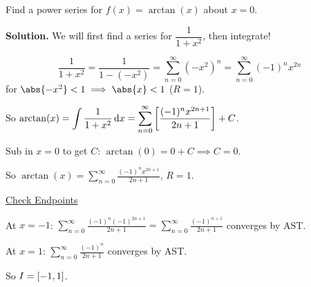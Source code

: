 \begin{Example}{}{}
    Find a power series for $ f(x)=\arctan(x) $ about $ x=0 $.

    \textbf{Solution.} We will first find a series for $ \dfrac{1}{1+x^2} $,
    then integrate!

    \[ \frac{1}{1+x^2} =\frac{1}{1-(-x^2)} =
        \sum\limits_{n=0}^{\infty} (-x^2)^n
        =\sum\limits_{n=0}^{\infty} (-1)^n x^{2n} \]
    for $ \abs{-x^2}<1\implies \abs{x}<1 $ ($ R=1 $).

    So $ \displaystyle\arctan(x)=\int \frac{1}{1+x^2} \odif{x} =
        \sum\limits_{n=0}^{\infty} \left[ \frac{(-1)^n x^{2n+1}}{2n+1}  \right] +C $.

    Sub in $ x=0 $ to get $ C $: $ \arctan(0)=0+C\implies C=0 $.

    So $ \displaystyle \arctan(x)=\sum\limits_{n=0}^{\infty} \frac{(-1)^n x^{2n+1}}{2n+1}  $,
    $ R=1 $.

    \underline{Check Endpoints}

    At $ x=-1 $: $ \displaystyle \sum\limits_{n=0}^{\infty} \frac{(-1)^n(-1)^{2n+1}}{2n+1}
        =\sum\limits_{n=0}^{\infty} \frac{(-1)^{n+1}}{2n+1}  $ converges by AST\@.

    At $ x=1 $: $ \displaystyle \sum\limits_{n=0}^{\infty} \frac{(-1)^n}{2n+1}  $
    converges by AST\@.

    So $ I=\interval{-1}{1} $.
\end{Example}

